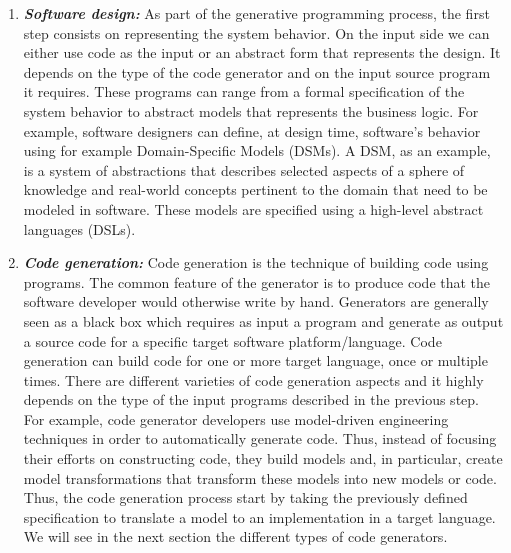 \begin{enumerate}
	\item \textbf{\textit{Software design:}} 
	As part of the generative programming process, the first step consists on representing the system behavior. 
	On the input side we can either use code as the input or an abstract form that represents the design. It depends on the type of the code generator and on the input source program it requires. These programs can range from a formal specification of the system behavior to abstract models that represents the business logic.
	For example, software designers can define, at design time, software’s behavior using for example Domain-Specific Models (DSMs).
	A DSM, as an example, is a system of abstractions that describes selected aspects of a sphere of knowledge and real-world concepts pertinent to the domain that need to be modeled in software. These models are specified using a high-level abstract languages (DSLs). %
	
	\item \textbf{\textit{Code generation:}} 
	Code generation is the technique of building code using programs. The common feature of the generator is to produce code that the software developer would otherwise write by hand.
	Generators are generally seen as a black box which requires as input a program and generate as output a source code for a specific target software platform/language. %
	Code generation can build code for one or more target language, once or multiple times. There are different varieties of code generation aspects and it highly depends on the type of the input programs described in the previous step. 
	For example, code generator developers use model-driven engineering techniques in order to automatically generate code. Thus, instead of focusing their efforts on constructing code, they build models and, in particular, create model transformations that transform these models into new models or code. Thus, the code generation process start by taking the previously defined specification to translate a model to an implementation in a target language. We will see in the next section the different types of code generators.
	

\end{enumerate}
